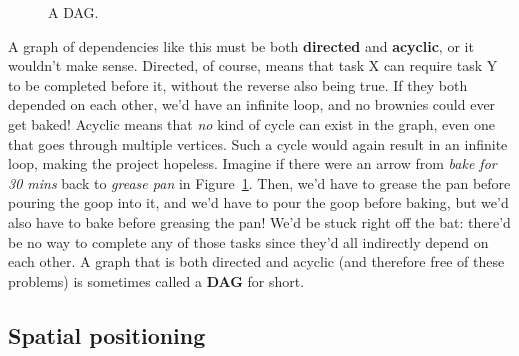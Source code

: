 \begin{description}
\begin{figure}[ht]
\centering
{}
\caption{A DAG.}
\label{DAG}
\end{figure}

A graph of dependencies like this must be both \textbf{directed} and
\textbf{acyclic}, or it wouldn't make sense. Directed, of course, means
that task X can require task Y to be completed before it, without the
reverse also being true. If they both depended on each other, we'd have an
infinite loop, and no brownies could ever get baked! Acyclic means that
\textit{no} kind of cycle can exist in the graph, even one that goes
through multiple vertices. Such a cycle would again result in an infinite
loop, making the project hopeless. Imagine if there were an arrow from
\textsl{bake for 30 mins} back to \textsl{grease pan} in Figure~\ref{DAG}.
Then, we'd have to grease the pan before pouring the goop into it, and we'd
have to pour the goop before baking, but we'd also have to bake before
greasing the pan! We'd be stuck right off the bat: there'd be no way to
complete any of those tasks since they'd all indirectly depend on each
other. A graph that is both directed and acyclic (and therefore free of
these problems) is sometimes called a \textbf{DAG} for short.

\end{description}


\subsection{Spatial positioning}

